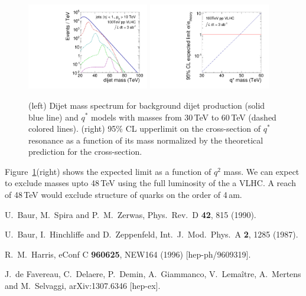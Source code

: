 \begin{figure}
\begin{center}
\includegraphics[width=0.475\textwidth]{QstarVLHC/plots/qstar_100TeV}
\includegraphics[width=0.475\textwidth]{QstarVLHC/plots/qstar_limits}
\end{center}
\caption{\label{fig:qstar_vlhc}(left) Dijet mass spectrum for
  background dijet production (solid blue line) and $q^*$ models with
  masses from 30\,TeV to 60\,TeV (dashed colored lines). (right) 95\%
  CL upperlimit on the cross-section of $q^*$ resonance as a function
  of its mass normalized by the theoretical prediction for the
  cross-section.}
\end{figure}

Figure~\ref{fig:qstar_vlhc}(right) shows the expected limit as a
function of $q^2$ mass.  We can expect to exclude masses upto 48\,TeV
using the full luminosity of the a VLHC.  A reach of 48\,TeV would
exclude structure of quarks on the order of 4\,am.

\begin{thebibliography}{99}

  U.~Baur, M.~Spira and P.~M.~Zerwas,
  Phys.\ Rev.\ D {\bf 42}, 815 (1990).

  U.~Baur, I.~Hinchliffe and D.~Zeppenfeld,
  Int.\ J.\ Mod.\ Phys.\ A {\bf 2}, 1285 (1987).

  R.~M.~Harris,
  eConf C {\bf 960625}, NEW164 (1996)
  [hep-ph/9609319].

  J.~de Favereau, C.~Delaere, P.~Demin, A.~Giammanco, V.~Lemaître, A.~Mertens and M.~Selvaggi,
  arXiv:1307.6346 [hep-ex].

\end{thebibliography}


